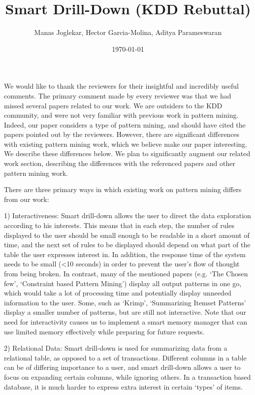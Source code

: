 \documentclass{article}
\date{\today}
\begin{document}
\title{Smart Drill-Down (KDD Rebuttal)}
\author{Manas Joglekar, Hector Garcia-Molina, Aditya Parameswaran}
\maketitle

We would like to thank the reviewers for their insightful and incredibly useful comments. The primary comment made by every reviewer was that we had missed several papers related to our work. We are outsiders to the KDD community, and were not very familiar with previous work in pattern mining. Indeed, our paper considers a type of pattern mining, and should have cited the papers pointed out by the reviewers. However, there are significant differences with existing pattern mining work, which we believe make our paper interesting. We describe these differences below. We plan to significantly augment our related work section, describing the differences with the referenced papers and other pattern mining work.

There are three primary ways in which existing work on pattern mining differs from our work:

1) Interactiveness: Smart drill-down allows the user to direct the data exploration according to his interests. This means that in each step, the number of rules displayed to the user should be small enough to be readable in a short amount of time, and the next set of rules to be displayed should depend on what part of the table the user expresses interest in. In addition, the response time of the system needs to be small (<10 seconds) in order to prevent the user's flow of thought from being broken. In contrast, many of the mentioned papers (e.g. `The Chosen few', `Constraint based Pattern Mining') display all output patterns in one go, which would take a lot of processing time and potentially display unneeded information to the user. Some, such as `Krimp', `Summarizing Itemset Patterns' display a smaller number of patterns, but are still not interactive. Note that our need for interactivity causes us to implement a smart memory manager that can use limited memory effectively while preparing for future requests.

2) Relational Data: Smart drill-down is used for summarizing data from a relational table, as opposed to a set of transactions. Different columns in a table can be of differing importance to a user, and smart drill-down allows a user to focus on expanding certain columns, while ignoring others. In a transaction based database, it is much harder to express extra interest in certain `types' of items. 
\end{document}
